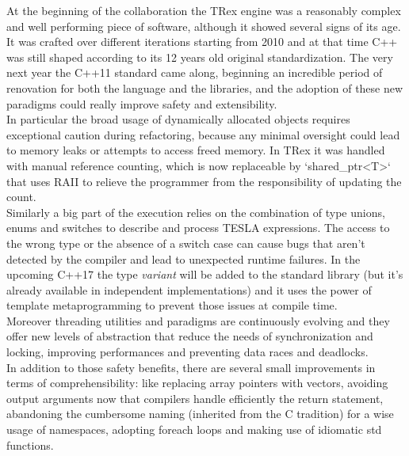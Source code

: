 At the beginning of the collaboration the TRex engine was a reasonably complex and well performing piece of software, although it showed several signs of its age. It was crafted over different iterations starting from 2010 and at that time C++ was still shaped according to its 12 years old original standardization. The very next year the C++11 standard came along, beginning an incredible period of renovation for both the language and the libraries, and the adoption of these new paradigms could really improve safety and extensibility.\\
In particular the broad usage of dynamically allocated objects requires exceptional caution during refactoring, because any minimal oversight could lead to memory leaks or attempts to access freed memory. In TRex it was handled with manual reference counting, which is now replaceable by `shared_ptr<T>` that uses RAII to relieve the programmer from the responsibility of updating the count.\\
Similarly a big part of the execution relies on the combination of type unions, enums and switches to describe and process TESLA expressions. The access to the wrong type or the absence of a switch case can cause bugs that aren't detected by the compiler and lead to unexpected runtime failures. In the upcoming C++17 the type \emph{variant} will be added to the standard library (but it's already available in independent implementations) and it uses the power of template metaprogramming to prevent those issues at compile time.\\
Moreover threading utilities and paradigms are continuously evolving and they offer new levels of abstraction that reduce the needs of synchronization and locking, improving performances and preventing data races and deadlocks.\\
In addition to those safety benefits, there are several small improvements in terms of comprehensibility: like replacing array pointers with vectors, avoiding output arguments now that compilers handle efficiently the return statement, abandoning the cumbersome naming (inherited from the C tradition) for a wise usage of namespaces, adopting foreach loops and making use of idiomatic std functions.


